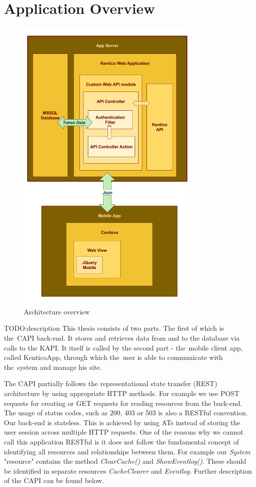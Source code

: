 \section{Application Overview}
\begin{figure}[ht!]
  \centering
  \includegraphics[width=0.8\textwidth]{Images/Architecture.png}
  \caption{Architecture overview}
  \label{architectureOverview}
\end{figure}
TODO:description
This thesis consists of two parts. The first of which is the~CAPI back-end. It stores and retrieves data from and to the database via calls to the KAPI. It itself is called by the second part - the~mobile client app, called KenticoApp, through which the~user is able to communicate with the~system and manage his site.

The CAPI partially follows the representational state transfer (REST) architecture by using appropriate HTTP methods. For example we use POST requests for creating or GET requests for reading resources from the back-end. The usage of status codes, such as 200, 403 or 503 is also a RESTful convention. Our back-end is stateless. This is achieved by using ATs instead of storing the user session across multiple HTTP requests. One of the reasons why we cannot call this application RESTful is it does not follow the fundamental concept of identifying all resources and relationships between them. For example our \textit{System} "resource" contains the method \textit{ClearCache()} and \textit{ShowEventlog()}. These should be identified in separate resources \textit{CacheClearer} and \textit{Eventlog}. Further description of the CAPI can be found below.

